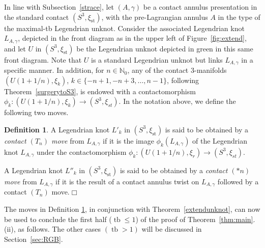 \documentclass[11pt]{amsart} %
\DeclareMathOperator{\tb}{tb}
\newcommand{\N}{\mathbb{N}}
\newcommand{\xist}{\xi_{\mathrm{st}}}
\theoremstyle{plain}
\theoremstyle{definition}
\newtheorem{defi}[Theorem]{Definition}
\begin{document}
In line with Subsection~\ref{strace}, let $(A,\gamma)$ be a contact annulus presentation in the standard contact $(S^3,\xist)$, with the pre-Lagrangian annulus $A$ in the type of the maximal-tb Legendrian unknot. Consider the associated Legendrian knot $L_{A,\gamma}$, depicted in the front diagram as in the upper left of Figure~\ref{fig:extend}, and let $U$ in $(S^3,\xist)$ be the Legendrian unknot depicted in green in this same front diagram. Note that $U$ is a standard Legendrian unknot but links $L_{A,\gamma}$ in a specific manner. In addition, for $n\in\N_0$, any of the contact $3$-manifolds $(U(1+1/n),\xi_k)$, $k\in\{-n+1, -n+3, \ldots, n-1\}$, following Theorem~\ref{surgerytoS3}, is endowed with a contactomorphism $\phi_k \colon(U(1+1/n),\xi_k)\longrightarrow(S^3,\xi_{st})$. In the notation above, we define the following two moves.

\begin{defi}\label{def:contactmoves}
A Legendrian knot $L'_k$ in $(S^3,\xist)$ is said to be obtained by a \textit{contact $(T_n)$ move} from $L_{A,\gamma}$ if it is the image $\phi_k(L_{A,\gamma})$ of the Legendrian knot $L_{A,\gamma}$ under the contactomorphism $\phi_k\colon(U(1+1/n),\xi_r)\longrightarrow(S^3,\xi_{st})$. 

\noindent A Legendrian knot $L''_k$ in $(S^3,\xist)$ is said to be obtained by a \textit{contact $(*n)$ move} from $L_{A,\gamma}$ if it is the result of a contact annulus twist on $L_{A,\gamma}$ followed by a contact $(T_n)$ move.\hfill$\Box$
\end{defi}

The moves in Definition \ref{def:contactmoves}, in conjunction with Theorem~\ref{extendunknot}, can now be used to conclude the first half ($\tb\leq1$) of the proof of Theorem~\ref{thm:main}.(ii), as follows. The other cases $(\tb>1)$ will be discussed in Section~\ref{sec:RGB}.
\end{document}
